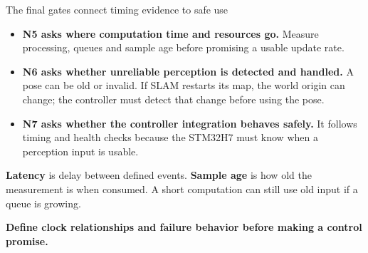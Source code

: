 \documentclass[aspectratio=169,12pt,t]{beamer}
\newcommand{\para}[1]{#1\par\medskip}
\newcommand{\lesson}[1]{\vfill{\color{teal!70!black}\bfseries #1}\par}
\begin{document}
\begin{frame}{The final gates connect timing evidence to safe use}

\begin{itemize}
\item \textbf{N5 asks where computation time and resources go.} Measure processing, queues and sample age before promising a usable update rate.
\item \textbf{N6 asks whether unreliable perception is detected and handled.} A pose can be old or invalid. If SLAM restarts its map, the world origin can change; the controller must detect that change before using the pose.
\item \textbf{N7 asks whether the controller integration behaves safely.} It follows timing and health checks because the STM32H7 must know when a perception input is usable.
\end{itemize}
\para{\textbf{Latency} is delay between defined events. \textbf{Sample age} is how old the measurement is when consumed. A short computation can still use old input if a queue is growing.}
\lesson{Define clock relationships and failure behavior before making a control promise.}

\end{frame}
\end{document}
